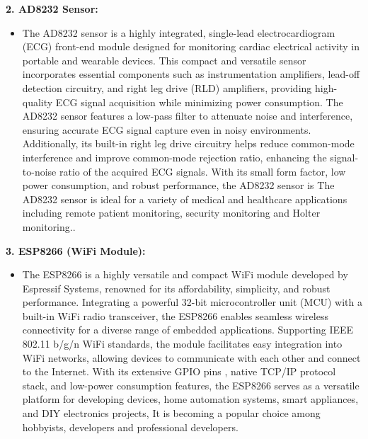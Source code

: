 \textbf{2. AD8232 Sensor:}
\begin{itemize}
    \item The AD8232 sensor \cite{mendes2023ad8232} is a highly integrated, single-lead electrocardiogram (ECG) front-end module designed for monitoring cardiac electrical activity in portable and wearable devices. This compact and versatile sensor incorporates essential components such as instrumentation amplifiers, lead-off detection circuitry, and right leg drive (RLD) amplifiers\cite{yang2021new}, providing high-quality ECG signal acquisition while minimizing power consumption. The AD8232 sensor features a low-pass filter to attenuate noise and interference, ensuring accurate ECG signal capture even in noisy environments. Additionally, its built-in right leg drive circuitry helps reduce common-mode interference and improve common-mode rejection ratio, enhancing the signal-to-noise ratio of the acquired ECG signals. With its small form factor, low power consumption, and robust performance, the AD8232 sensor is The AD8232 sensor is ideal for a variety of medical and healthcare applications including remote patient monitoring, security monitoring and Holter monitoring..
\end{itemize}

\textbf{3. ESP8266 (WiFi Module):}
\begin{itemize}
    \item The ESP8266 is a highly versatile and compact WiFi module developed by Espressif Systems, renowned for its affordability, simplicity, and robust performance. Integrating a powerful 32-bit microcontroller unit (MCU) with a built-in WiFi radio transceiver, the ESP8266 enables seamless wireless connectivity for a diverse range of embedded applications. Supporting IEEE 802.11 b/g/n WiFi standards, the module facilitates easy integration into WiFi networks, allowing devices to communicate with each other and connect to the Internet. With its extensive GPIO pins \cite{schmidli2023different}, native TCP/IP protocol stack, and low-power consumption features, the ESP8266 serves as a versatile platform for developing devices, home automation systems, smart appliances, and DIY electronics projects, It is becoming a popular choice among hobbyists, developers and professional developers.
\end{itemize}

